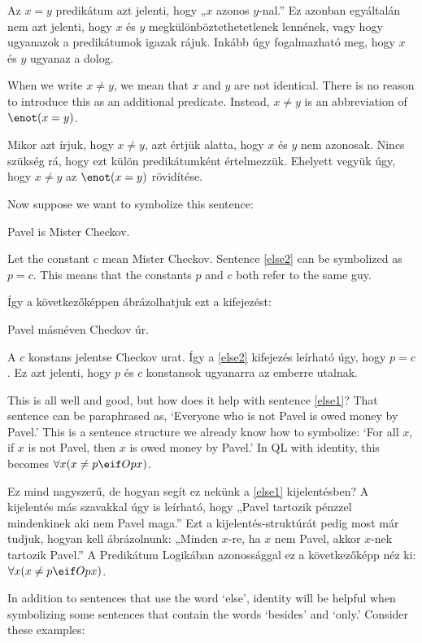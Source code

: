 Az $x=y$ predikátum azt jelenti, hogy „$x$ azonos $y$-nal.” Ez azonban egyáltalán nem azt jelenti, hogy $x$ és $y$ megkülönböztethetetlenek lennének, vagy hogy ugyanazok a predikátumok igazak rájuk. Inkább úgy fogalmazható meg, hogy $x$ és $y$ ugyanaz a dolog.

When we write $x \neq y$, we mean that $x$ and $y$ are not identical. There is no reason to introduce this as an additional predicate. Instead, $x \neq y$ is an abbreviation of $\enot(x = y)$.

Mikor azt írjuk, hogy $x \neq y$, azt értjük alatta, hogy $x$ és $y$ nem azonosak. Nincs szükség rá, hogy ezt külön predikátumként értelmezzük. Ehelyett vegyük úgy, hogy $x \neq y$ az $\enot(x = y)$ rövidítése.

Now suppose we want to symbolize this sentence:
\begin{earg}
\item[\ex{else2}] Pavel is Mister Checkov.
\end{earg}
Let the constant $c$ mean Mister Checkov. Sentence \ref{else2} can be symbolized as $p=c$. This means that the constants $p$ and $c$ both refer to the same guy.

Így a következőképpen ábrázolhatjuk ezt a kifejezést:
\begin{earg}
\item[\ex{else2}] Pavel másnéven Checkov úr.
\end{earg}
A $c$ konstans jelentse Checkov urat. Így a \ref{else2} kifejezés leírható úgy, hogy $p=c$. Ez azt jelenti, hogy $p$ és $c$ konstansok ugyanarra az emberre utalnak.

This is all well and good, but how does it help with sentence \ref{else1}? That sentence can be paraphrased as, `Everyone who is not Pavel is owed money by Pavel.' This is a sentence structure we already know how to symbolize: `For all $x$, if $x$ is not Pavel, then $x$ is owed money by Pavel.' In QL with identity, this becomes $\forall x (x\neq p \eif Opx)$.

Ez mind nagyszerű, de hogyan segít ez nekünk a \ref{else1} kijelentésben? A kijelentés más szavakkal úgy is leírható, hogy „Pavel tartozik pénzzel mindenkinek aki nem Pavel maga.” Ezt a kijelentés-struktúrát pedig most már tudjuk, hogyan kell ábrázolnunk: „Minden $x$-re, ha $x$ nem Pavel, akkor $x$-nek tartozik Pavel.” A Predikátum Logikában azonossággal ez a következőképp néz ki: $\forall x (x\neq p \eif Opx)$.

In addition to sentences that use the word `else', identity will be helpful when symbolizing some sentences that contain the words `besides' and `only.' Consider these examples:

